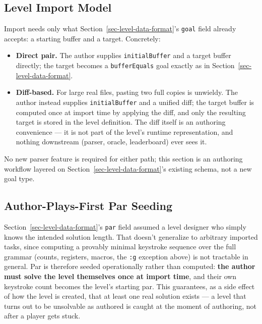 \documentclass[11pt]{article}
\providecommand{\tightlist}{%
  \setlength{\itemsep}{0pt}\setlength{\parskip}{0pt}}
\begin{document}
\hypertarget{sec-level-import-model}{%
\subsection{Level Import Model}\label{sec-level-import-model}}

Import needs only what Section~\ref{sec-level-data-format}'s \texttt{goal} field already accepts: a starting
buffer and a target. Concretely:

\begin{itemize}
\tightlist
\item
  \textbf{Direct pair.} The author supplies \texttt{initialBuffer} and a target buffer
  directly; the target becomes a \texttt{bufferEquals} goal exactly as in Section~\ref{sec-level-data-format}.
\item
  \textbf{Diff-based.} For large real files, pasting two full copies is unwieldy.
  The author instead supplies \texttt{initialBuffer} and a unified diff; the target
  buffer is computed once at import time by applying the diff, and only the
  resulting target is stored in the level definition. The diff itself is an
  authoring convenience --- it is not part of the level's runtime
  representation, and nothing downstream (parser, oracle, leaderboard) ever
  sees it.
\end{itemize}

No new parser feature is required for either path; this section is an
authoring workflow layered on Section~\ref{sec-level-data-format}'s existing schema, not a new goal
type.

\hypertarget{sec-author-plays-first-par-seeding}{%
\subsection{Author-Plays-First Par Seeding}\label{sec-author-plays-first-par-seeding}}

Section~\ref{sec-level-data-format}'s \texttt{par} field assumed a level designer who simply knows the
intended solution length. That doesn't generalize to arbitrary imported
tasks, since computing a provably minimal keystroke sequence over the full
grammar (counts, registers, macros, the \texttt{:g} exception above) is not
tractable in general. Par is therefore seeded operationally rather than
computed: \textbf{the author must solve the level themselves once at import
time}, and their own keystroke count becomes the level's starting par. This
guarantees, as a side effect of how the level is created, that at least one
real solution exists --- a level that turns out to be unsolvable as authored
is caught at the moment of authoring, not after a player gets stuck.
\end{document}
